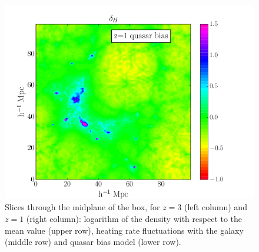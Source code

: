 \documentclass[numberedappendix]{emulateapj}
\begin{document}
\begin{figure}
\includegraphics[width = .45\textwidth ]{data_delta_z1_qso4.png}
\caption{ Slices through the midplane of the box, for $z=3$ (left column) and $z=1$ (right column): logarithm of the density with respect to the mean value (upper row), heating rate fluctuations with the galaxy (middle row) and quasar bias model (lower row). }
\label{fig:slice}
\end{figure}
\end{document}
